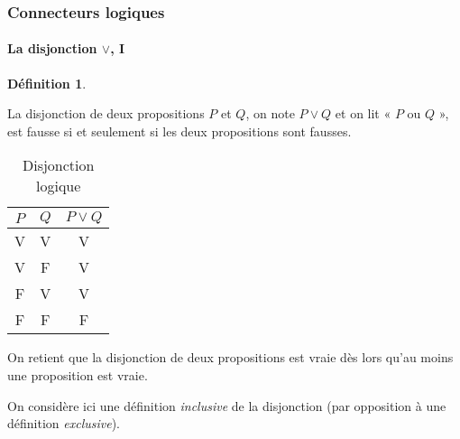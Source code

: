 \documentclass[10pt,notheorems]{beamer}
\theoremstyle{plain}
\theoremstyle{definition} %
\newtheorem{definition}{Définition}
\begin{document}
\begin{frame}
  \frametitle{Connecteurs logiques}
  \framesubtitle{La disjonction $\lor$, I}
  \hypertarget{slide_disjonction_1}{}

  \begin{definition}\label{def:disjonction}

    La disjonction de deux propositions $P$ et $Q$, on note $P\lor Q$
    et on lit « $P$ ou $Q$ », est fausse si et seulement si les
    deux propositions sont fausses.
  \end{definition}

  \bigskip

  \begin{table}[H]

    \centering
    \begin{tabular}[H]{|cc|c|}
      \hline
      $P$ & $Q$ & $P \lor Q$\\ \hline
      V & V & V \\
      V & F & V \\
      F & V & V \\
      F & F & F \\
      \hline\hline
    \end{tabular}
    \caption{Disjonction logique}
    \label{tab:disjonction}
  \end{table}

  \bigskip

  On retient que la disjonction de deux propositions est vraie dès
  lors qu'au moins une proposition est vraie.

  \bigskip

  On considère ici une définition \textit{inclusive} de la disjonction (par opposition à une définition \textit{exclusive}).

\end{frame}
\end{document}
